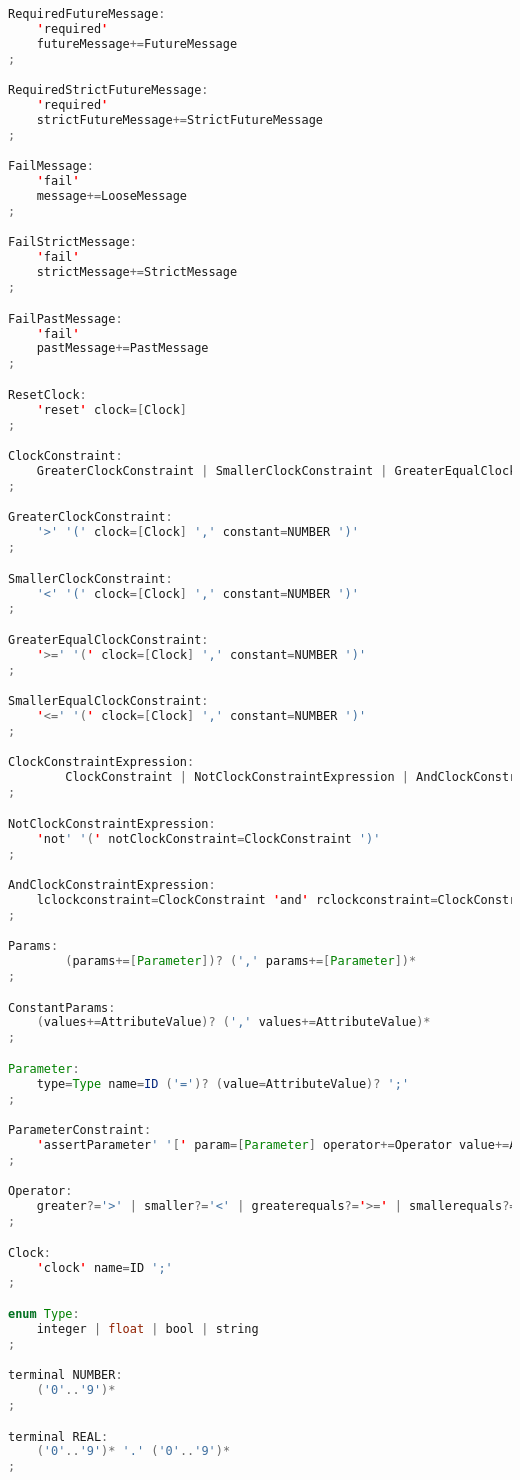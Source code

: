 \begin{lstlisting}[language=java, caption={\textit{Xtext} nyelvtan specifikációja.},captionpos=b,label=xtext_tpsc_grammar]
RequiredFutureMessage:
	'required'
	futureMessage+=FutureMessage
;

RequiredStrictFutureMessage:
	'required'
	strictFutureMessage+=StrictFutureMessage
;

FailMessage:
	'fail'
	message+=LooseMessage
;

FailStrictMessage:
	'fail'
	strictMessage+=StrictMessage
;

FailPastMessage:
	'fail'
	pastMessage+=PastMessage
;

ResetClock:
	'reset' clock=[Clock]
;

ClockConstraint:
	GreaterClockConstraint | SmallerClockConstraint | GreaterEqualClockConstraint | SmallerEqualClockConstraint
;

GreaterClockConstraint:
	'>' '(' clock=[Clock] ',' constant=NUMBER ')'
;

SmallerClockConstraint:
	'<' '(' clock=[Clock] ',' constant=NUMBER ')'
;

GreaterEqualClockConstraint:
	'>=' '(' clock=[Clock] ',' constant=NUMBER ')'
;

SmallerEqualClockConstraint:
	'<=' '(' clock=[Clock] ',' constant=NUMBER ')'
;

ClockConstraintExpression:
		ClockConstraint | NotClockConstraintExpression | AndClockConstraintExpression
;

NotClockConstraintExpression:
	'not' '(' notClockConstraint=ClockConstraint ')'
;

AndClockConstraintExpression:
	lclockconstraint=ClockConstraint 'and' rclockconstraint=ClockConstraint
;

Params:
		(params+=[Parameter])? (',' params+=[Parameter])* 
;

ConstantParams:
	(values+=AttributeValue)? (',' values+=AttributeValue)* 
;

Parameter:
	type=Type name=ID ('=')? (value=AttributeValue)? ';'
;

ParameterConstraint:
	'assertParameter' '[' param=[Parameter] operator+=Operator value+=AttributeValue ']' 'in' object=[Object] ';'
;

Operator:
	greater?='>' | smaller?='<' | greaterequals?='>=' | smallerequals?='<=' | equals?='==' | notequals?='!='
;

Clock:
	'clock' name=ID ';'
;

enum Type:
	integer | float | bool | string
;

terminal NUMBER:
	('0'..'9')*
;

terminal REAL:
	('0'..'9')* '.' ('0'..'9')*
;


\end{lstlisting}
